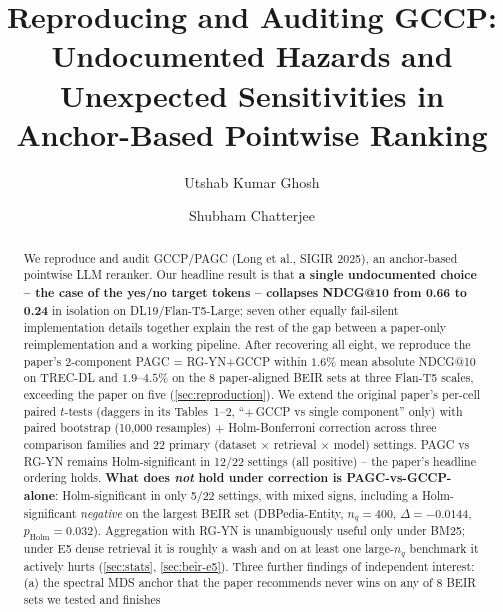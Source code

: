 \documentclass[sigconf]{acmart}
\begin{document}
\title{Reproducing and Auditing GCCP: Undocumented Hazards and Unexpected Sensitivities in Anchor-Based Pointwise Ranking}

\author{Utshab Kumar Ghosh}

\author{Shubham Chatterjee}

\renewcommand{\shortauthors}{Ghosh and Chatterjee}

\begin{abstract}
We reproduce and audit GCCP/PAGC (Long et al., SIGIR 2025), an
anchor-based pointwise LLM reranker. Our headline result is that
\textbf{a single undocumented choice -- the case of the
yes/no target tokens -- collapses NDCG@10 from 0.66 to 0.24} in
isolation on DL19/Flan-T5-Large; seven other equally fail-silent
implementation details together explain the rest of the gap between
a paper-only reimplementation and a working pipeline. After
recovering all eight, we reproduce the paper's
2-component PAGC = RG-YN+GCCP within $1.6\%$ mean absolute NDCG@10
on TREC-DL and $1.9$--$4.5\%$ on the 8 paper-aligned BEIR sets at
three Flan-T5 scales, exceeding the paper on five
(\textsection\ref{sec:reproduction}).
We extend the original paper's per-cell paired $t$-tests (daggers in
its Tables~1--2, ``$+$\,GCCP vs single component'' only) with paired
bootstrap (10{,}000 resamples) + Holm-Bonferroni correction across
three comparison families and 22 primary
(dataset $\times$ retrieval $\times$ model) settings. PAGC vs RG-YN
remains Holm-significant in 12/22 settings (all positive) -- the
paper's headline ordering holds. \textbf{What does \emph{not} hold
under correction is PAGC-vs-GCCP-alone}: Holm-significant in only
5/22 settings, with mixed signs, including a Holm-significant
\emph{negative} on the largest BEIR set (DBPedia-Entity, $n_q{=}400$,
$\Delta{=}{-}0.0144$, $p_{\text{Holm}}{=}0.032$). Aggregation with
RG-YN is unambiguously useful only under BM25; under E5 dense
retrieval it is roughly a wash and on at least one large-$n_q$
benchmark it actively hurts (\textsection\ref{sec:stats},
\textsection\ref{sec:beir-e5}). Three further findings of
independent interest: (a) the spectral MDS anchor that the paper
recommends never wins on any of 8 BEIR sets we tested and finishes

\end{abstract}
\end{document}
